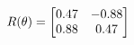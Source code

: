 \documentclass[preview]{standalone}
\begin{document}
\begin{align*}
\special{dvisvgm:raw <g id='unique000'>}R(\theta) = \begin{bmatrix}0.47 & -0.88\\0.88 & 0.47\end{bmatrix}\special{dvisvgm:raw </g>}
\end{align*}
\end{document}
